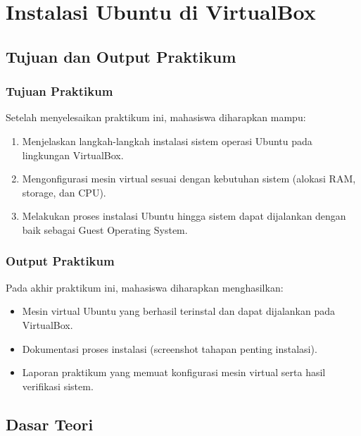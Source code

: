 
\chapter{Instalasi Ubuntu di VirtualBox}
\label{chap:modul-02}

\section{Tujuan dan Output Praktikum}

\subsection{Tujuan Praktikum}
Setelah menyelesaikan praktikum ini, mahasiswa diharapkan mampu:
\begin{enumerate}
	\item Menjelaskan langkah-langkah instalasi sistem operasi Ubuntu pada lingkungan VirtualBox.
	\item Mengonfigurasi mesin virtual sesuai dengan kebutuhan sistem (alokasi RAM, storage, dan CPU).
	\item Melakukan proses instalasi Ubuntu hingga sistem dapat dijalankan dengan baik sebagai Guest Operating System.
\end{enumerate}

\subsection{Output Praktikum}
Pada akhir praktikum ini, mahasiswa diharapkan menghasilkan:
\begin{itemize}
	\item Mesin virtual Ubuntu yang berhasil terinstal dan dapat dijalankan pada VirtualBox.
	\item Dokumentasi proses instalasi (screenshot tahapan penting instalasi).
	\item Laporan praktikum yang memuat konfigurasi mesin virtual serta hasil verifikasi sistem.
\end{itemize}


\newpage
\section{Dasar Teori}

